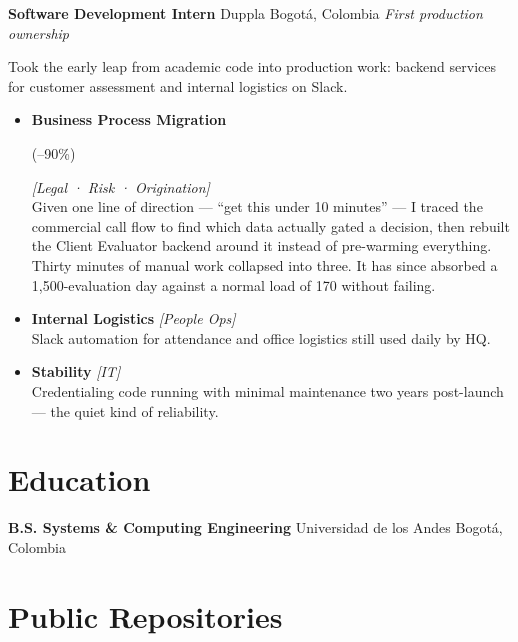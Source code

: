 \documentclass[11pt,a4paper,sans]{moderncv}
\newcommand{\impact}[1]{{\color{slate}\small #1}}
\newcommand{\metric}[1]{%
  \begingroup
  \setlength{\fboxsep}{2pt}%
  \colorbox{whisper}{\color{navy}\bfseries\strut #1}%
  \endgroup
}
\newcommand{\stakeholders}[1]{{\color{azure}\footnotesize\textsf{\textit{[#1]}}}}
\newcommand{\rolebold}[1]{{\color{navy}\bfseries #1}}
\newcommand{\softrule}{%
  \vspace{0.45em}
  \noindent\hspace{0pt}{\color{navy}\rule{6pt}{2pt}}{\color{softgray!40}\rule[0.5pt]{0.92\linewidth}{0.4pt}}\hspace{0pt}%
  \vspace{0.35em}
}
\begin{document}
%
  {\textbf{Software Development Intern}}%
  {Duppla}%
  {Bogotá, Colombia}%
  {\textit{First production ownership}}{%
  Took the early leap from academic code into production work: backend services for customer assessment and internal logistics on Slack.
  \begin{itemize}
    \item \rolebold{Business Process Migration} \metric{(--90\%)} \stakeholders{Legal · Risk · Origination}\\
      \impact{Given one line of direction --- ``get this under 10 minutes'' --- I traced the commercial call flow to find which data actually gated a decision, then rebuilt the Client Evaluator backend around it instead of pre-warming everything. Thirty minutes of manual work collapsed into three. It has since absorbed a 1,500-evaluation day against a normal load of 170 without failing.}
    \item \rolebold{Internal Logistics} \stakeholders{People Ops}\\
      \impact{Slack automation for attendance and office logistics still used daily by HQ.}
    \item \rolebold{Stability} \stakeholders{IT}\\
      \impact{Credentialing code running with minimal maintenance two years post-launch --- the quiet kind of reliability.}
  \end{itemize}
}

\softrule

\section{Education}
%
  {\textbf{B.S. Systems \& Computing Engineering}}%
  {Universidad de los Andes}%
  {Bogotá, Colombia}%
  {}{}

\softrule

\section{Public Repositories}
\end{document}
